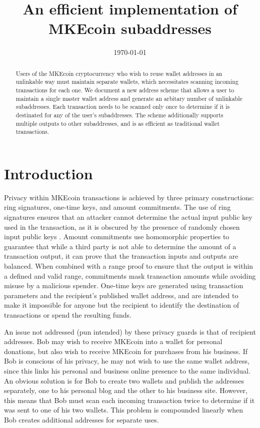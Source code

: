\documentclass{mrl}
\title{An efficient implementation of MKEcoin subaddresses}
\date{\today}
\begin{document}
\begin{abstract}
Users of the MKEcoin cryptocurrency who wish to reuse wallet addresses in an unlinkable way must maintain separate wallets, which necessitates scanning incoming transactions for each one. We document a new address scheme that allows a user to maintain a single master wallet address and generate an arbitary number of unlinkable subaddresses. Each transaction needs to be scanned only once to determine if it is destinated for any of the user's subaddresses. The scheme additionally supports multiple outputs to other subaddresses, and is as efficient as traditional wallet transactions.
\end{abstract}

\section{Introduction}
Privacy within MKEcoin transactions is achieved by three primary constructions: ring signatures, one-time keys, and amount commitments. The use of ring signatures ensures that an attacker cannot determine the actual input public key used in the transaction, as it is obscured by the presence of randomly chosen input public keys \cite{cryptonote}. Amount commitments use homomorphic properties to guarantee that while a third party is not able to determine the amount of a transaction output, it can prove that the transaction inputs and outputs are balanced. When combined with a range proof to ensure that the output is within a defined and valid range, commitments mask transaction amounts while avoiding misuse by a malicious spender. One-time keys are generated using transaction parameters and the recipient's published wallet address, and are intended to make it impossible for anyone but the recipient to identify the destination of transactions or spend the resulting funds.

An issue not addressed (pun intended) by these privacy guards is that of recipient addresses. Bob may wish to receive MKEcoin into a wallet for personal donations, but also wish to receive MKEcoin for purchases from his business. If Bob is conscious of his privacy, he may not wish to use the same wallet address, since this links his personal and business online presence to the same individual. An obvious solution is for Bob to create two wallets and publish the addresses separately, one to his personal blog and the other to his business site. However, this means that Bob must scan each incoming transaction twice to determine if it was sent to one of his two wallets. This problem is compounded linearly when Bob creates additional addresses for separate uses.
\end{document}
